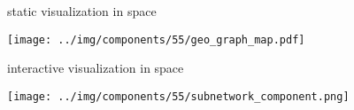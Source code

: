 \documentclass[
  8pt,
  ignorenonframetext,
]{beamer}
\begin{document}
\begin{frame}
static visualization in space

\begin{center}
\texttt{[image: ../img/components/55/geo\_graph\_map.pdf]}
\end{center}
\end{frame}

\begin{frame}
interactive visualization in space

\begin{center}
\texttt{[image: ../img/components/55/subnetwork\_component.png]}
\end{center}
\end{frame}
\end{document}
